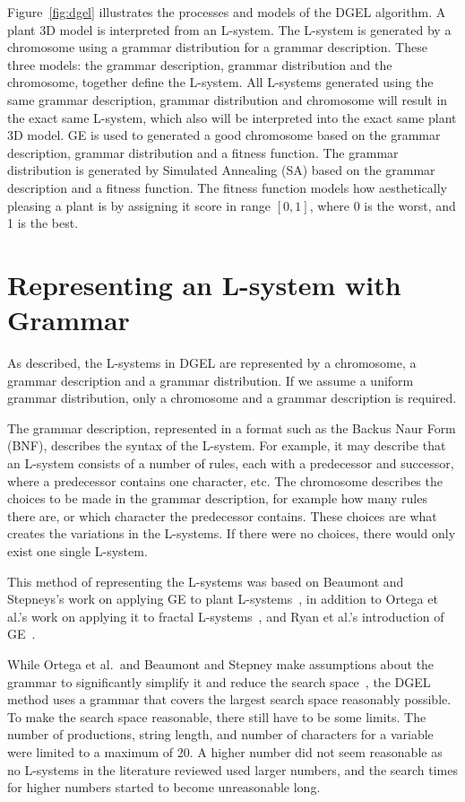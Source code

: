 Figure~\ref{fig:dgel} illustrates the processes and models of the DGEL algorithm.
A plant 3D model is interpreted from an L-system.
The L-system is generated by a chromosome using a grammar distribution for a grammar description.
These three models: the grammar description, grammar distribution and the chromosome, together define the L-system.
All L-systems generated using the same grammar description, grammar distribution and chromosome will result in the exact same L-system, which also will be interpreted into the exact same plant 3D model.
GE is used to generated a good chromosome based on the grammar description, grammar distribution and a fitness function.
The grammar distribution is generated by Simulated Annealing (SA) based on the grammar description and a fitness function.
The fitness function models how aesthetically pleasing a plant is by assigning it score in range $[0, 1]$, where 0 is the worst, and 1 is the best.

\section{Representing an L-system with Grammar}
\label{sec:grammar}
As described, the L-systems in DGEL are represented by a chromosome, a grammar description and a grammar distribution.
If we assume a uniform grammar distribution, only a chromosome and a grammar description is required.

The grammar description, represented in a format such as the Backus Naur Form (BNF), describes the syntax of the L-system.
For example, it may describe that an L-system consists of a number of rules, each with a predecessor and successor, where a predecessor contains one character, etc.
The chromosome describes the choices to be made in the grammar description, for example how many rules there are, or which character the predecessor contains.
These choices are what creates the variations in the L-systems.
If there were no choices, there would only exist one single L-system.

This method of representing the L-systems was based on Beaumont and Stepneys's work on applying GE to plant L-systems~\cite{2009Beaumont}, in addition to Ortega et al.'s work on applying it to fractal L-systems~\cite{2003Ortega}, and Ryan et al.'s introduction of GE~\cite{1998Ryan}.

While Ortega et al.\ and Beaumont and Stepney make assumptions about the grammar to significantly simplify it and reduce the search space~\cite{2003Ortega, 2009Beaumont}, the DGEL method uses a grammar that covers the largest search space reasonably possible.
To make the search space reasonable, there still have to be some limits.
The number of productions, string length, and number of characters for a variable were limited to a maximum of 20.
A higher number did not seem reasonable as no L-systems in the literature reviewed used larger numbers, and the search times for higher numbers started to become unreasonable long.

